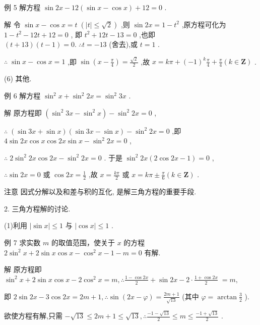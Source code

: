\documentclass[10pt]{article}
\begin{document}
例 5 解方程 \(\sin {2x} - {12}\left( {\sin x - \cos x}\right)  + {12} = 0\) .

解 令 \(\sin x - \cos x = t\;\left( {\left| t\right|  \leq  \sqrt{2}}\right)\) ,则 \(\sin {2x} = 1 - {t}^{2}\) ,原方程可化为 \(1 - {t}^{2} - {12t} + {12} = 0\) , 即 \({t}^{2} + {12t} - {13} = 0\) ,也即 \(\left( {t + {13}}\right) \left( {t - 1}\right)  = 0.\;\therefore t =  - {13}\) (舍去),或 \(t = 1\) .

\(\therefore \;\sin x - \cos x = 1\) ,即 \(\sin \left( {x - \frac{\pi }{4}}\right)  = \frac{\sqrt{2}}{2}\) ,故 \(x = {k\pi } + {\left( -1\right) }^{k}\frac{\pi }{4} + \frac{\pi }{4}\left( {k \in  \mathbf{Z}}\right)\) .

(6) 其他.

例 6 解方程 \({\sin }^{2}x + {\sin }^{2}{2x} = {\sin }^{2}{3x}\) .

解 原方程即 \(\left( {{\sin }^{2}{3x} - {\sin }^{2}x}\right)  - {\sin }^{2}{2x} = 0\) ,

\(\therefore \;\left( {\sin {3x} + \sin x}\right) \left( {\sin {3x} - \sin x}\right)  - {\sin }^{2}{2x} = 0\) ,即 \(4\sin {2x}\cos x\cos {2x}\sin x - {\sin }^{2}{2x} = 0\) ,

\(\therefore \;2{\sin }^{2}{2x}\cos {2x} - {\sin }^{2}{2x} = 0\) . 于是 \({\sin }^{2}{2x}\left( {2\cos {2x} - 1}\right)  = 0\) ,

\(\therefore \sin {2x} = 0\) 或 \(\cos {2x} = \frac{1}{2}\) ,故 \(x = \frac{k\pi }{2}\) 或 \(x = {k\pi } \pm  \frac{\pi }{6}\left( {k \in  \mathbf{Z}}\right)\) .

注意 因式分解以及和差与积的互化, 是解三角方程的重要手段.

2. 三角方程解的讨论.

(1)利用 \(\left| {\sin x}\right|  \leq  1\) 与 \(\left| {\cos x}\right|  \leq  1\) .

例 7 求实数 \(m\) 的取值范围，使关于 \(x\) 的方程 \(2{\sin }^{2}x + 2\sin x\cos x - {\cos }^{2}x - 1 - m = 0\) 有解.

解 原方程即 \({\sin }^{2}x + 2\sin x\cos x - 2{\cos }^{2}x = m,\therefore \frac{1 - \cos {2x}}{2} + \sin {2x} - 2 \cdot  \frac{1 + \cos {2x}}{2} \; = m,\)

即 \(2\sin {2x} - 3\cos {2x} = {2m} + 1,\therefore \sin \left( {{2x} - \varphi }\right)  = \frac{{2m} + 1}{\sqrt{13}}\) (其中 \(\varphi  = \arctan \frac{3}{2}\) ).

欲使方程有解,只需 \(- \sqrt{13} \leq  {2m} + 1 \leq  \sqrt{13},\therefore \frac{-1 - \sqrt{13}}{2} \leq  m \leq  \frac{-1 + \sqrt{13}}{2}\) .
\end{document}
